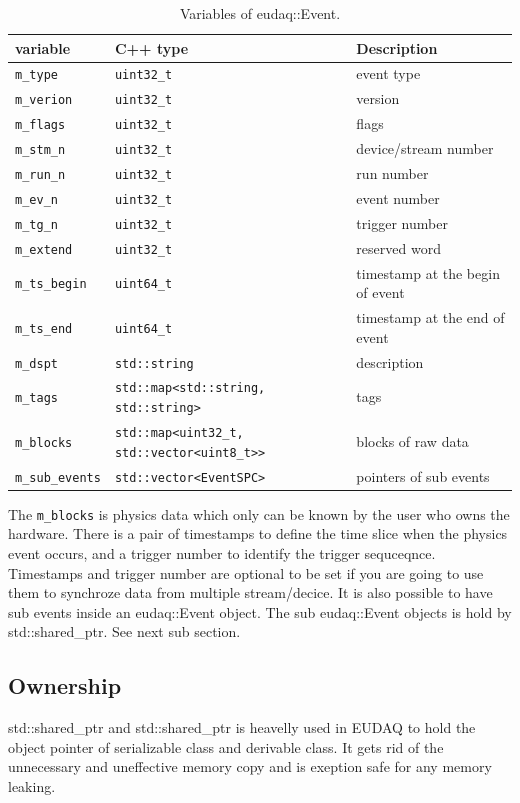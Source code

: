 \begin{table}
\centering
\small
\begin{tabular}{ l | l | l }
  \textbf{variable} & \textbf{C++ type} & \textbf{Description}\\
  \hline
  \texttt{m\_type} & \texttt{uint32\_t} & event type\\
  \texttt{m\_verion} & \texttt{uint32\_t} & version\\
  \texttt{m\_flags} & \texttt{uint32\_t} & flags\\
  \texttt{m\_stm\_n} & \texttt{uint32\_t} & device/stream number\\
  \texttt{m\_run\_n} & \texttt{uint32\_t} & run number\\
  \texttt{m\_ev\_n} & \texttt{uint32\_t} & event number\\
  \texttt{m\_tg\_n} & \texttt{uint32\_t} & trigger number\\
  \texttt{m\_extend} & \texttt{uint32\_t} & reserved word\\
  \texttt{m\_ts\_begin} & \texttt{uint64\_t} & timestamp at the begin of event\\
  \texttt{m\_ts\_end} & \texttt{uint64\_t} & timestamp at the end of event\\
  \texttt{m\_dspt} & \texttt{std::string} & description\\
  \texttt{m\_tags} & \texttt{std::map<std::string, std::string>} & tags\\
  \texttt{m\_blocks} & \texttt{std::map<uint32\_t, std::vector<uint8\_t>>} & blocks of raw data\\
  \texttt{m\_sub\_events} & \texttt{std::vector<EventSPC>} & pointers of sub events\\
\end{tabular}
\caption{Variables of eudaq::Event.}
\label{tab:eventdata}
\end{table}

The \texttt{m\_blocks} is physics data which only can be known by the user who owns the hardware. There is a pair of timestamps to define the time slice when the physics event occurs, and a trigger number to identify the trigger sequceqnce. Timestamps and trigger number are optional to be set if you are going to use them to synchroze data from multiple stream/decice. It is also possible to have sub events inside an eudaq::Event object. The sub eudaq::Event objects is hold by std::shared\_ptr. See next sub section.

\subsection{Ownership}
std::shared\_ptr and std::shared\_ptr is heavelly used in EUDAQ to hold the object pointer of serializable class and derivable class. It gets rid of the unnecessary and uneffective memory copy and is exeption safe for any memory leaking.

